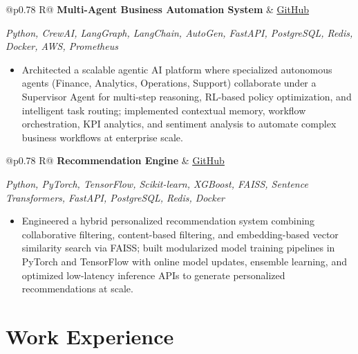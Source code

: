 \documentclass[a4paper,10pt]{article}
\newcommand{\ulink}[2]{\href{#1}{\uline{#2}}}
\newcommand{\subheading}[1]{{\color[HTML]{0A0A0A}\fontsize{12}{14}\selectfont\bfseries #1}}
\newcommand{\techstack}[1]{{\color[HTML]{5C5C5C}\fontsize{10.5}{12.5}\selectfont\itshape #1}}
\newcommand{\meta}[1]{{\color[HTML]{5C5C5C}\fontsize{10.5}{12.5}\selectfont #1}}
\begin{document}
\begin{tabularx}{\linewidth}{@{}p{0.78\linewidth} R@{}}
\subheading{Multi-Agent Business Automation System} & \meta{\ulink{https://github.com/su-jin1425/Multi-Agent-Business-Automation}{GitHub}}
\end{tabularx}
\vspace{1pt}
\techstack{Python, CrewAI, LangGraph, LangChain, AutoGen, FastAPI, PostgreSQL, Redis, Docker, AWS, Prometheus}
\begin{itemize}[nosep, leftmargin=1.5em, itemsep=1pt, topsep=2pt]
\item {\color[HTML]{0A0A0A}\fontsize{11}{14}\selectfont
Architected a scalable agentic AI platform where specialized autonomous agents (Finance, Analytics, Operations, Support) collaborate under a Supervisor Agent for multi-step reasoning, RL-based policy optimization, and intelligent task routing; implemented contextual memory, workflow orchestration, KPI analytics, and sentiment analysis to automate complex business workflows at enterprise scale.}
\end{itemize}

\newpage

\vspace{2pt}

\begin{tabularx}{\linewidth}{@{}p{0.78\linewidth} R@{}}
\subheading{Recommendation Engine } & \meta{\ulink{https://github.com/su-jin1425/Recommendation-Engine}{GitHub}}
\end{tabularx}
\vspace{1pt}
\techstack{Python, PyTorch, TensorFlow, Scikit-learn, XGBoost, FAISS, Sentence Transformers, FastAPI, PostgreSQL, Redis, Docker}
\begin{itemize}[nosep, leftmargin=1.5em, itemsep=1pt, topsep=2pt]
\item {\color[HTML]{0A0A0A}\fontsize{11}{14}\selectfont
Engineered a hybrid personalized recommendation system combining collaborative filtering, content-based filtering, and embedding-based vector similarity search via FAISS; built modularized model training pipelines in PyTorch and TensorFlow with online model updates, ensemble learning, and optimized low-latency inference APIs to generate personalized recommendations at scale.}
\end{itemize}

\vspace{2pt}

\section{Work Experience}
\vspace{2pt}
\end{document}
